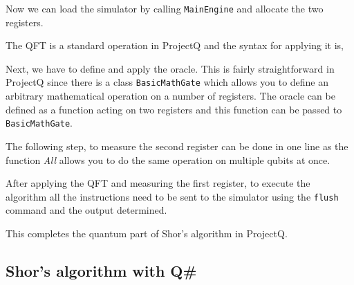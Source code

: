 Now we can load the simulator by calling \texttt{MainEngine} and allocate the two registers.



The QFT is a standard operation in ProjectQ and the syntax for applying it is,



Next, we have to define and apply the oracle. This is fairly straightforward in ProjectQ since there is a class \texttt{BasicMathGate} which allows you to define an arbitrary mathematical operation on a number of registers. The oracle can be defined as a function acting on two registers and this function can be passed to \texttt{BasicMathGate}.



The following step, to measure the second register can be done in one line as the function \textit{All} allows you to do the same operation on multiple qubits at once.



After applying the QFT and measuring the first register, to execute the algorithm all the instructions need to be sent to the simulator using the \texttt{flush} command and the output determined.



This completes the quantum part of Shor's algorithm in ProjectQ.

\subsection{Shor's algorithm with Q\#}

